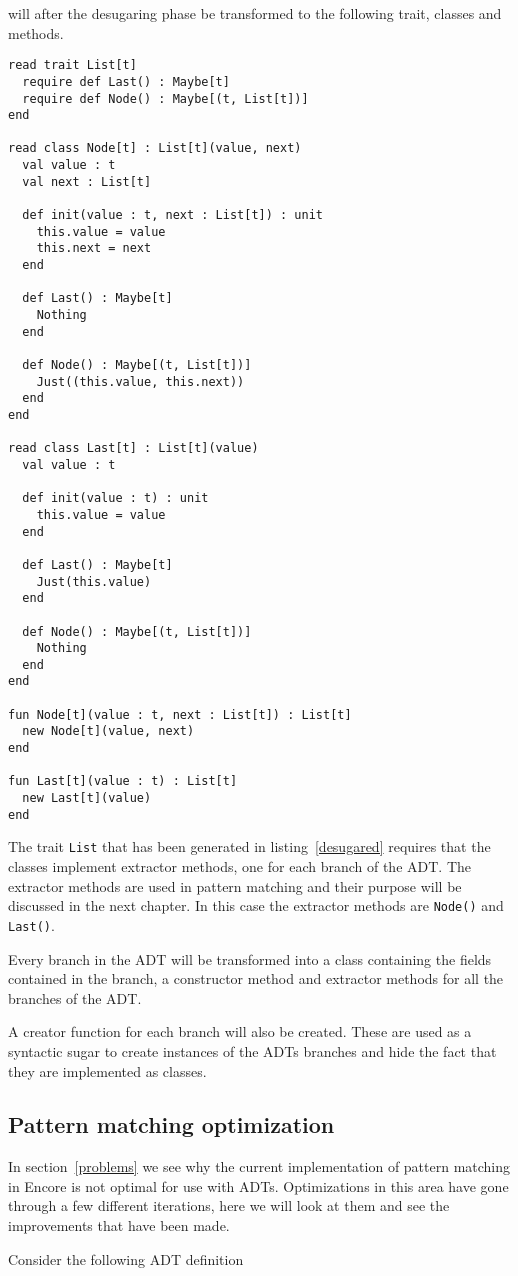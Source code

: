 \documentclass[10pt]{report}
\def\code#1{\texttt{#1}} %
\begin{document}
{\par{will after the desugaring phase be transformed to the following trait, classes and methods.}

\begin{lstlisting}[language=encore,caption={Desugared linked list},label=desugared]
read trait List[t]
  require def Last() : Maybe[t]
  require def Node() : Maybe[(t, List[t])]
end

read class Node[t] : List[t](value, next)
  val value : t
  val next : List[t]

  def init(value : t, next : List[t]) : unit
    this.value = value
    this.next = next
  end

  def Last() : Maybe[t]
    Nothing
  end

  def Node() : Maybe[(t, List[t])]
    Just((this.value, this.next))
  end
end

read class Last[t] : List[t](value)
  val value : t

  def init(value : t) : unit
    this.value = value
  end

  def Last() : Maybe[t]
    Just(this.value)
  end

  def Node() : Maybe[(t, List[t])]
    Nothing
  end
end

fun Node[t](value : t, next : List[t]) : List[t]
  new Node[t](value, next)
end

fun Last[t](value : t) : List[t]
  new Last[t](value)
end

\end{lstlisting}

\par{The trait \code{List} that has been generated in listing~\ref{desugared} requires that the classes implement extractor methods, one for each branch of the ADT\@. The extractor methods are used in pattern matching and their purpose will be discussed in the next chapter. In this case the extractor methods are \code{Node()} and \code{Last()}.}

\par{Every branch in the ADT will be transformed into a class containing the fields contained in the branch, a constructor method and extractor methods for all the branches of the ADT.}

\par{A creator function for each branch will also be created. These are used as a syntactic sugar to create instances of the ADTs branches and hide the fact that they are implemented as classes.}

\subsection{Pattern matching optimization}
\label{ch:optimization}
\par{In section~\ref{problems} we see why the current implementation of pattern matching in Encore is not optimal for use with ADTs. Optimizations in this area have gone through a few different iterations, here we will look at them and see the improvements that have been made.}
\par{Consider the following ADT definition}

}
\end{document}

